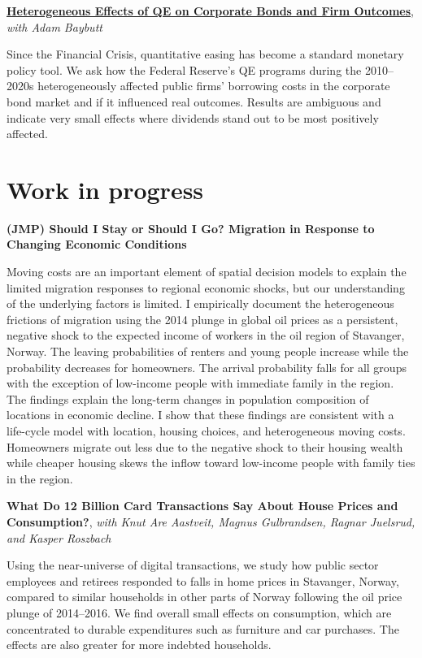 \documentclass{clean_cv}
\begin{document}
\medskip

\href{http://www.adambaybutt.org/uploads/1/2/4/9/124972193/baybutt_bojeryd-2021-qe_and_firms.pdf}{\textbf{Heterogeneous Effects of QE on Corporate Bonds and Firm Outcomes}}, \emph{with Adam Baybutt}

Since the Financial Crisis, quantitative easing has become a standard monetary policy tool. We ask how the Federal Reserve's QE programs during the 2010--2020s heterogeneously affected public firms' borrowing costs in the corporate bond market and if it influenced real outcomes. Results are ambiguous and indicate very small effects where dividends stand out to be most positively affected.


\section{Work in progress}


\textbf{(JMP) Should I Stay or Should I Go? Migration in Response to Changing Economic Conditions}

Moving costs are an important element of spatial decision models to explain the limited migration responses to regional economic shocks, but our understanding of the underlying factors is limited. I empirically document the heterogeneous frictions of migration using the 2014 plunge in global oil prices as a persistent, negative shock to the expected income of workers in the oil region of Stavanger, Norway. The leaving probabilities of renters and young people increase while the probability decreases for homeowners. The arrival probability falls for all groups with the exception of low-income people with immediate family in the region. The findings explain the long-term changes in population composition of locations in economic decline. I show that these findings are consistent with a life-cycle model with location, housing choices, and heterogeneous moving costs. Homeowners migrate out less due to the negative shock to their housing wealth while cheaper housing skews the inflow toward low-income people with family ties in the region.

\medskip


\textbf{What Do 12 Billion Card Transactions Say About House Prices and Consumption?}, \emph{with Knut Are Aastveit, Magnus Gulbrandsen, Ragnar Juelsrud, and Kasper Roszbach}

Using the near-universe of digital transactions, we study how public sector employees and retirees responded to falls in home prices in Stavanger, Norway, compared to similar households in other parts of Norway following the oil price plunge of 2014--2016. We find overall small effects on consumption, which are concentrated to durable expenditures such as furniture and car purchases. The effects are also greater for more indebted households.
\end{document}
